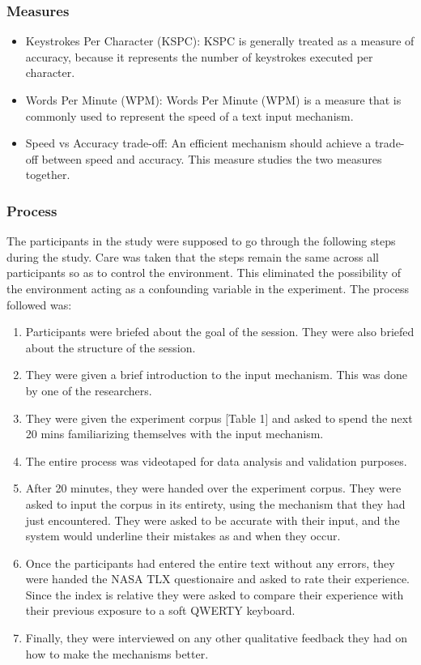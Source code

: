 \subsubsection{Measures}
\begin{itemize}
	\item Keystrokes Per Character (KSPC): KSPC is generally treated as a measure of accuracy, because it
represents the number of keystrokes executed per character.
	\item Words Per Minute (WPM): Words Per Minute (WPM) is a measure that is commonly used to represent
the speed of a text input mechanism.
	\item Speed vs Accuracy trade-off: An efficient mechanism should achieve a trade-off between speed and accuracy. This measure studies the two measures together.
\end{itemize}
\subsubsection{Process}

The participants in the study were supposed to go through the
following steps during the study. Care was taken that the steps remain
the same across all participants so as to control the
environment. This eliminated the
possibility of the environment acting as a confounding variable in the
experiment. The process followed was:

\begin{enumerate}
\item Participants were briefed about the goal of the session. They
  were also briefed about the structure of the session.
\item They were given a brief introduction to the input
  mechanism. This was done by one of the researchers.
\item They were given the experiment corpus [Table 1] and asked to spend the next 20
  mins familiarizing themselves with the input mechanism.
\item The entire process was videotaped for data analysis and
  validation purposes.
\item After 20 minutes, they were handed over the experiment
  corpus. They were asked to input the corpus in its entirety, using
  the mechanism that they had just encountered. They were asked to be
  accurate with their input, and the system would underline their
  mistakes as and when they occur.
\item Once the participants had entered the entire text without any
  errors, they were handed the NASA TLX questionaire and asked to rate
  their experience. Since the index is relative they were asked to
  compare their experience with their previous exposure to a soft
  QWERTY keyboard. 
\item Finally, they were interviewed on any other qualitative feedback
  they had on how to make the mechanisms better.
\end{enumerate}
	